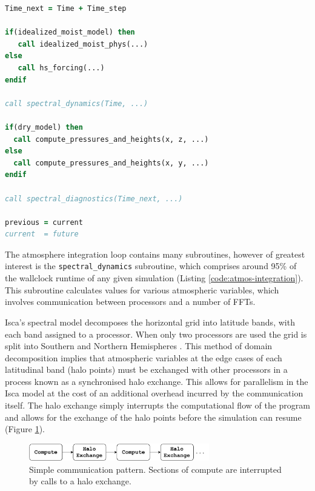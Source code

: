 \documentclass[a4paper,11pt]{report}
\begin{document}
\begin{lstlisting}[language=Fortran,label={code:atmos-integration},caption={Pseudocode for the atmospheric integration loop found in Isca.}]
Time_next = Time + Time_step

if(idealized_moist_model) then
   call idealized_moist_phys(...)
else
   call hs_forcing(...)
endif

call spectral_dynamics(Time, ...)

if(dry_model) then
  call compute_pressures_and_heights(x, z, ...)
else
  call compute_pressures_and_heights(x, y, ...)
endif

call spectral_diagnostics(Time_next, ...)

previous = current
current  = future
\end{lstlisting}
\par
The atmosphere integration loop contains many subroutines, however of greatest interest is the \texttt{spectral\_dynamics} subroutine, which comprises around 95\% of the wallclock runtime of any given simulation (Listing \ref{code:atmos-integration}). This subroutine calculates values for various atmospheric variables, which involves  communication between processors and a number of FFTs. 
\par
Isca's spectral model decomposes the horizontal grid into latitude bands, with each band assigned to a processor. When only two processors are used the grid is split into Southern and Northern Hemispheres \cite{isca2019github}. This method of domain decomposition implies that atmospheric variables at the edge cases of each latitudinal band (halo points) must be exchanged with other processors in a process known as a synchronised halo exchange. This allows for parallelism in the Isca model at the cost of an additional overhead incurred by the communication itself. The halo exchange simply interrupts the computational flow of the program and allows for the exchange of the halo points before the simulation can resume (Figure \ref{fig:halo-exchange}).

\begin{figure}[htbp]
\begin{center}
\includegraphics[width=0.7\textwidth]{img/comm_pattern.pdf}
\caption[Simple halo exchange]{Simple communication pattern. Sections of compute are interrupted by calls to a halo exchange.}
\label{fig:halo-exchange}
\end{center}
\end{figure}
\end{document}
